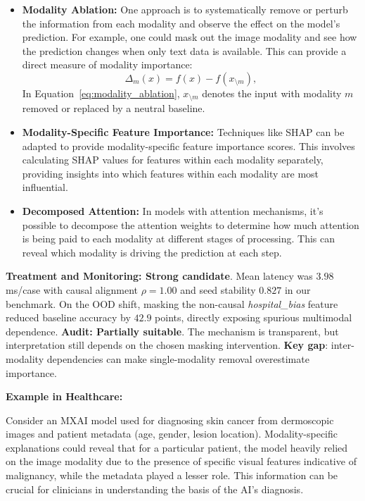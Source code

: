 \documentclass[pdflatex,sn-mathphys-num]{sn-jnl}%
\theoremstyle{thmstyleone}%
\theoremstyle{thmstyletwo}%
\theoremstyle{thmstylethree}%
\begin{document}
\begin{itemize}
\begin{itemize}
    \item \textbf{Modality Ablation:} One approach is to systematically remove or perturb the information from each modality and observe the effect on the model's prediction. For example, one could mask out the image modality and see how the prediction changes when only text data is available. This can provide a direct measure of modality importance:
    \begin{equation}
    \Delta_m(x) = f(x) - f(x_{\setminus m}),
    \label{eq:modality_ablation}    
    \end{equation}
    In Equation~\eqref{eq:modality_ablation}, $x_{\setminus m}$ denotes the input with modality $m$ removed or replaced by a neutral baseline.
    \item \textbf{Modality-Specific Feature Importance:} Techniques like SHAP can be adapted to provide modality-specific feature importance scores. This involves calculating SHAP values for features within each modality separately, providing insights into which features within each modality are most influential.
    \item \textbf{Decomposed Attention:} In models with attention mechanisms, it's possible to decompose the attention weights to determine how much attention is being paid to each modality at different stages of processing. This can reveal which modality is driving the prediction at each step.
\end{itemize}

\begin{tcolorbox}[colback=green!5,colframe=green!50!black,title=\textbf{Clinical Suitability Assessment: Modality Ablation}]
\textbf{Treatment and Monitoring: Strong candidate}. Mean latency was $3.98$ ms/case with causal alignment $\rho=1.00$ and seed stability $0.827$ in our benchmark. On the OOD shift, masking the non-causal \textit{hospital\_bias} feature reduced baseline accuracy by $42.9$ points, directly exposing spurious multimodal dependence. \textbf{Audit: Partially suitable}. The mechanism is transparent, but interpretation still depends on the chosen masking intervention. \textbf{Key gap}: inter-modality dependencies can make single-modality removal overestimate importance.
\end{tcolorbox}

\textbf{Example in Healthcare:}

Consider an MXAI model used for diagnosing skin cancer from dermoscopic images and patient metadata (age, gender, lesion location). Modality-specific explanations could reveal that for a particular patient, the model heavily relied on the image modality due to the presence of specific visual features indicative of malignancy, while the metadata played a lesser role. This information can be crucial for clinicians in understanding the basis of the AI's diagnosis.


\end{itemize}
\end{document}
